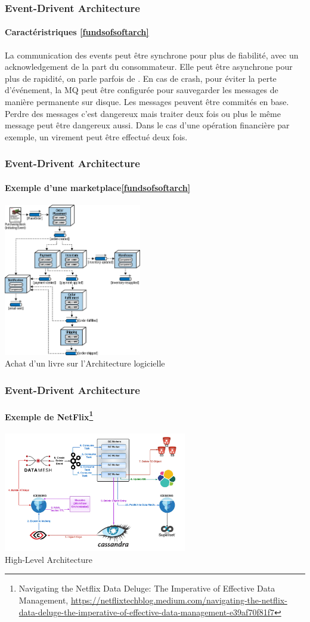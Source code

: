 \documentclass{beamer}
\begin{document}
    \begin{frame}
        \transdissolve
        \frametitle{Event-Drivent Architecture}
        \framesubtitle{Caractéristriques \cref{fundsofsoftarch}}
        La communication des events peut être synchrone pour plus de fiabilité, avec un acknowledgement de la part du consommateur.
        \bigbreak
        Elle peut être asynchrone pour plus de rapidité, on parle parfois de .
        \bigbreak
        En cas de crash, pour éviter la perte d'événement, la MQ peut être configurée pour sauvegarder les messages de manière permanente sur disque.
        Les messages peuvent être commités en base.
        \bigbreak
        Perdre des messages c'est dangereux mais traiter deux fois ou plus le même message peut être dangereux aussi.
        Dans le cas d'une opération financière par exemple, un virement peut être effectué deux fois.
    \end{frame}

    \begin{frame}
        \transdissolve
        \frametitle{Event-Drivent Architecture}
        \framesubtitle{Exemple d'une marketplace\cref{fundsofsoftarch}}
        \centering
        \includegraphics[width=6cm]{image/event-driven-example} \\ Achat d'un livre sur l'Architecture logicielle \\
    \end{frame}

    \begin{frame}
        \transdissolve
        \frametitle{Event-Drivent Architecture}
        \framesubtitle{Exemple de NetFlix\footnote{Navigating the Netflix Data Deluge: The Imperative of Effective Data Management, \url{https://netflixtechblog.medium.com/navigating-the-netflix-data-deluge-the-imperative-of-effective-data-management-e39af70f81f7}}}
        \centering
        \includegraphics[width=8cm]{image/netflix-data-deluge} \\ High-Level Architecture \\
    \end{frame}
\end{document}
